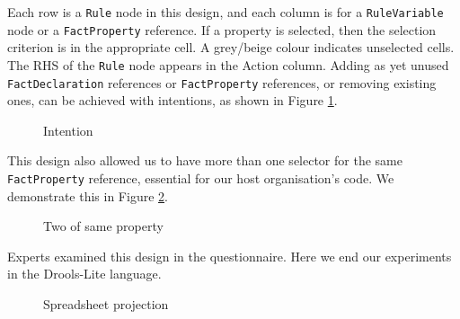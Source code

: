 Each row is a \texttt{Rule} node in this design, and each column is for a \texttt{RuleVariable} node or a \texttt{FactProperty} reference.
If a property is selected, then the selection criterion is in the appropriate cell.
A grey/beige colour indicates unselected cells.
The RHS of the \texttt{Rule} node appears in the Action column.
Adding as yet unused \texttt{FactDeclaration} references or \texttt{FactProperty} references, or removing existing ones, can be achieved with intentions, as shown in Figure \ref{fig:SpreadsheetIntentions}.

\begin{figure}[h]
    \centering
    \caption{Intention}
    \label{fig:SpreadsheetIntentions}
\end{figure}

This design also allowed us to have more than one selector for the same \texttt{FactProperty} reference, essential for our host organisation's code.
We demonstrate this in Figure \ref{fig:TwoProperties}.

\begin{figure}[h]
    \centering
    \caption{Two of same property}
    \label{fig:TwoProperties}
\end{figure}

Experts examined this design in the questionnaire. 
Here we end our experiments in the Drools-Lite language.

\begin{figure}
    \centering
    \caption{Spreadsheet projection}
    \label{fig:SpreadsheetProjection}
\end{figure}

